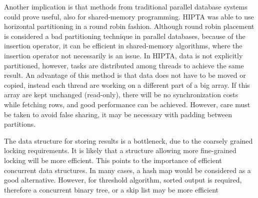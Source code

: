 Another implication is that methods from traditional parallel database
systems could prove useful, also for shared-memory programming. HIPTA
was able to use horizontal partitioning in a round robin fashion.
Although round robin placement is considered a bad partitioning
technique in parallel databases, because of the insertion operator, it
can be efficient in shared-memory algorithms, where the insertion
operator not necessarily is an issue. In HIPTA, data is not explicitly
partitioned, however, tasks are distributed among threads to achieve
the same result. An advantage of this method is that data does not
have to be moved or copied, instead each thread are working on a
different part of a big array. If this array are kept unchanged
(read-only), there will be no synchronization costs while fetching
rows, and good performance can be achieved. However, care must be
taken to avoid false sharing, it may be necessary with padding between
partitions.

The data structure for storing results is a bottleneck, due to the
coarsely grained locking requirements. It is likely that a structure
allowing more fine-grained locking will be more efficient. This points
to the importance of efficient concurrent data structures. In many
cases, a hash map would be considered as a good alternative. However,
for threshold algorithm, sorted output is required, therefore a
concurrent binary tree, or a skip list may be more efficient
